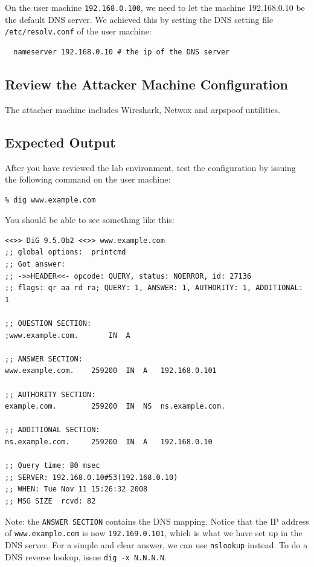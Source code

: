 On the user machine {\tt 192.168.0.100}, we need to let the machine
192.168.0.10 be the default DNS server. We achieved this by setting
the DNS setting file \texttt{/etc/resolv.conf} of the user machine:

\begin{verbatim}
  nameserver 192.168.0.10 # the ip of the DNS server 
\end{verbatim}


\subsection{Review the Attacker Machine Configuration}

The attacher machine includes Wireshark, Netwox and arpspoof untilities.

\subsection{Expected Output}

After you have reviewed the lab environment, 
test the configuration by issuing the following
command on the user machine: 
\begin{verbatim}
% dig www.example.com
\end{verbatim}

You should be able to see something like this:

\begin{verbatim}
<<>> DiG 9.5.0b2 <<>> www.example.com
;; global options:  printcmd
;; Got answer:
;; ->>HEADER<<- opcode: QUERY, status: NOERROR, id: 27136
;; flags: qr aa rd ra; QUERY: 1, ANSWER: 1, AUTHORITY: 1, ADDITIONAL: 1

;; QUESTION SECTION:
;www.example.com.		IN	A

;; ANSWER SECTION:
www.example.com.	259200	IN	A	192.168.0.101

;; AUTHORITY SECTION:
example.com.		259200	IN	NS	ns.example.com.

;; ADDITIONAL SECTION:
ns.example.com.		259200	IN	A	192.168.0.10

;; Query time: 80 msec
;; SERVER: 192.168.0.10#53(192.168.0.10)
;; WHEN: Tue Nov 11 15:26:32 2008
;; MSG SIZE  rcvd: 82
\end{verbatim}

Note: the {\tt ANSWER SECTION} contains the DNS mapping. Notice that
the IP address of {\tt www.example.com} is now {\tt 192.169.0.101}, which
is what we have set up in the DNS server.
For a simple and clear answer,
we can use {\tt nslookup} instead. 
To do a DNS reverse lookup, issue {\tt dig -x N.N.N.N}.


